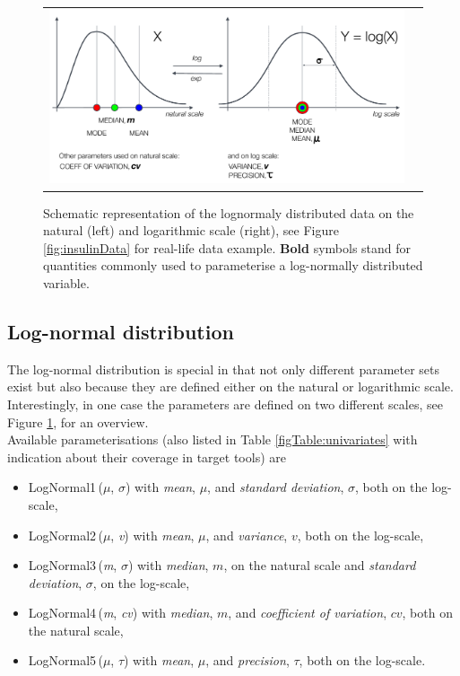 {\begin{figure}[htb!]
\centering
\begin{tabular}{cc}
 \includegraphics[width=160mm]{pics/normalAndLogDomain_schema}
\end{tabular}
\caption{Schematic representation of the lognormaly distributed data on the natural (left) 
and logarithmic scale (right), see Figure \ref{fig:insulinData} for real-life data example. 
\textbf{Bold} symbols stand for quantities commonly used to parameterise a log-normally 
distributed variable.}
\label{fig:schematicLogNormal}
\end{figure}

\subsection{Log-normal distribution}
\label{subsec:logNormalForms}
The log-normal distribution is special in that not only different parameter sets exist
but also because they are defined either on the natural or logarithmic scale. Interestingly, in one 
case the parameters are defined on two different scales, see Figure \ref{fig:schematicLogNormal},
for an overview.\\
Available parameterisations (also listed in Table \ref{figTable:univariates} 
with indication about their coverage in target tools) are 
\begin{itemize}
\item
LogNormal1\,($\mu$, $\sigma$) with \emph{mean}, $\mu$, and \emph{standard deviation}, $\sigma$, both on the log-scale, 
\item
LogNormal2\,($\mu$, \textit{v}) with \emph{mean}, $\mu$, and \emph{variance}, $v$, both on the log-scale, 
\item
LogNormal3\,(\textit{m}, $\sigma$)  with \emph{median}, $m$, on the natural scale and \emph{standard deviation}, $\sigma$, on the log-scale, 
\item
LogNormal4\,(\textit{m}, \textit{cv}) with \emph{median}, $m$, and \emph{coefficient of variation}, $cv$, both on the natural scale, 
\item
LogNormal5\,($\mu$, $\tau$) with \emph{mean}, $\mu$, and \emph{precision}, $\tau$, both on the log-scale.
\end{itemize}

}
